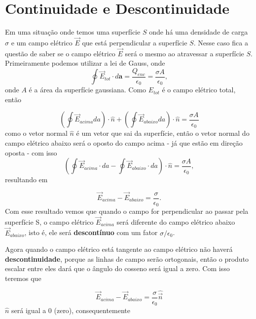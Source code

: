 \newpage\section{Continuidade e Descontinuidade}Em uma situação onde temos uma superfície $S$ onde há uma densidade de carga $\sigma$  e um campo elétrico $\Vec{E}$ que está perpendicular a superfície $S$. Nesse caso fica a questão de saber se o campo elétrico $\Vec{E}$ será o mesmo ao atravessar a superfície $S$. 
Primeiramente podemos utilizar a lei de Gauss, onde 
\begin{equation}
    \oint \Vec{E}_{tot} \cdot d\mathbf{a} = \frac{Q_{enc}}{\epsilon_{0}} = \frac{\sigma A}{\epsilon_{0}},
\end{equation}
onde $A$ é a área da superfície gaussiana. Como $E_{tot}$ é o campo elétrico total, então 

\begin{equation}
    \left(\oint \Vec{E}_{acima} da\right) \cdot \hat{n} +\left(\oint \Vec{E}_{abaixo} da\right) \cdot\hat{n} = \frac{\sigma A}{\epsilon_{0}}
\end{equation}
como o vetor normal $\hat{n}$ é um vetor que sai da superfície, então o vetor normal do campo elétrico abaixo será o oposto do campo acima - já que estão em direção oposta - com isso
\begin{equation*}
    \left(\oint\Vec{E}_{acima} \cdot da -\oint \Vec{E}_{abaixo} \cdot da\right) \cdot \hat{n} = \frac{\sigma A}{\epsilon_{0}},
\end{equation*}
resultando em 

\begin{equation}
    \Vec{E}_{acima} - \Vec{E}_{abaixo} = \frac{\sigma}{\epsilon_{0}}.
\end{equation}
Com esse resultado vemos que quando o campo for perpendicular ao passar pela superfície S, o campo elétrico \(\Vec{E}_{acima}\) será diferente do campo elétrico abaixo \(\Vec{E}_{abaixo}\), isto é, ele será  \textbf{descontínuo} com um fator $\sigma/\epsilon_0$. 


    

Agora quando o campo elétrico está tangente ao campo elétrico não haverá \textbf{descontinuidade}, porque as linhas de campo serão ortogonais, então o produto escalar entre eles dará que o ângulo do cosseno será igual a zero.  Com isso teremos que

\begin{equation}\label{seila}
    \Vec{E}_{acima} - \Vec{E}_{abaixo} = \frac{\sigma}{\epsilon_{0}} \hat{\vec{n}}
\end{equation}
\(\hat{n}\) será igual a $0$ (zero), consequentemente 



